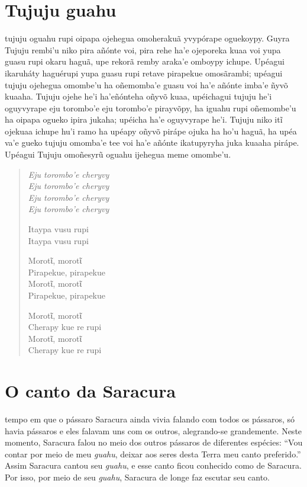 \chapter{Tujuju guahu}

 tujuju oguahu rupi oipapa ojehegua omoherakuã yvypórape oguekoypy.
Guyra Tujuju rembi'u niko pira añónte voi, pira rehe ha'e ojeporeka kuaa
voi yupa guasu rupi okaru haguã, upe rekorã remby araka'e omboypy
ichupe. Upéagui ikaruháty haguérupi yupa guasu rupi retave pirapekue
omosãrambi; upéagui tujuju ojehegua omombe'u ha oñemomba'e guasu voi
ha'e añónte imba'e ñyvõ kuaaha. Tujuju ojehe he’i ha’eñónteha oñyvõ kuaa, upéichagui tujuju he'i oguyvyrape eju torombo'e eju torombo'e
pirayvõpy, ha iguahu rupi oñemombe'u ha oipapa ogueko ipira jukaha;
upéicha ha'e oguyvyrape he'i. Tujuju niko itĩ ojekuaa ichupe hu'i ramo
ha upéapy oñyvõ pirápe ojuka ha ho'u haguã, ha upéa va'e gueko tujuju
omomba'e tee voi ha'e añónte ikatupyryha juka kuaaha pirápe. Upéagui
Tujuju omoñesyrũ oguahu ijehegua meme omombe'u.

\begin{verse}
\itshape
Eju torombo'e cheryvy\\
Eju torombo'e cheryvy\\
Eju torombo'e cheryvy\\
Eju torombo'e cheryvy

Itaypa vusu rupi\\
Itaypa vusu rupi

Morotῖ, morotῖ\\
Pirapekue, pirapekue\\
Morotῖ, morotῖ\\
Pirapekue, pirapekue

\pagebreak
Morotῖ, morotῖ\\
Cherapy kue re rupi\\
Morotῖ, morotῖ\\
Cherapy kue re rupi
\end{verse}

\chapter{O canto da Saracura}

 tempo em que o pássaro Saracura ainda vivia falando com todos os
pássaros, só havia pássaros e eles falavam uns com os outros,
alegrando-se grandemente. Neste momento, Saracura falou no meio dos
outros pássaros de diferentes espécies: ``Vou contar por meio de meu
\emph{guahu}, deixar aos seres desta Terra meu canto preferido.'' Assim
Saracura cantou seu \emph{guahu}, e esse canto ficou conhecido como de
Saracura. Por isso, por meio de seu \emph{guahu}, Saracura de longe faz
escutar seu canto.


